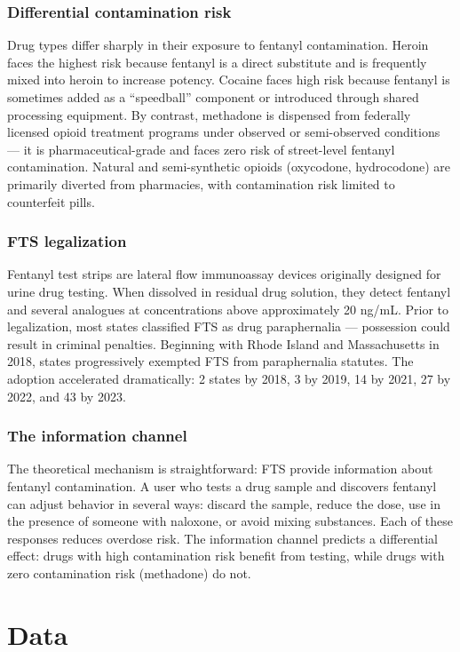 \documentclass[12pt]{article}
\begin{document}
\subsubsection*{Differential contamination risk}
Drug types differ sharply in their exposure to fentanyl contamination. Heroin faces the highest risk because fentanyl is a direct substitute and is frequently mixed into heroin to increase potency. Cocaine faces high risk because fentanyl is sometimes added as a ``speedball'' component or introduced through shared processing equipment. By contrast, methadone is dispensed from federally licensed opioid treatment programs under observed or semi-observed conditions --- it is pharmaceutical-grade and faces zero risk of street-level fentanyl contamination. Natural and semi-synthetic opioids (oxycodone, hydrocodone) are primarily diverted from pharmacies, with contamination risk limited to counterfeit pills.

\subsubsection*{FTS legalization}
Fentanyl test strips are lateral flow immunoassay devices originally designed for urine drug testing. When dissolved in residual drug solution, they detect fentanyl and several analogues at concentrations above approximately 20 ng/mL. Prior to legalization, most states classified FTS as drug paraphernalia --- possession could result in criminal penalties. Beginning with Rhode Island and Massachusetts in 2018, states progressively exempted FTS from paraphernalia statutes. The adoption accelerated dramatically: 2 states by 2018, 3 by 2019, 14 by 2021, 27 by 2022, and 43 by 2023.

\subsubsection*{The information channel}
The theoretical mechanism is straightforward: FTS provide information about fentanyl contamination. A user who tests a drug sample and discovers fentanyl can adjust behavior in several ways: discard the sample, reduce the dose, use in the presence of someone with naloxone, or avoid mixing substances. Each of these responses reduces overdose risk. The information channel predicts a differential effect: drugs with high contamination risk benefit from testing, while drugs with zero contamination risk (methadone) do not.

\section{Data}
\end{document}
